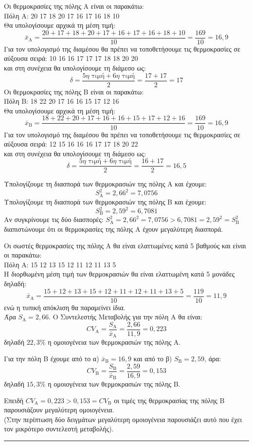 \begin{alist}
\item Οι θερμοκρασίες της πόλης Α είναι οι παρακάτω: \\
Πόλη Α: 20 17 18 20 17 16 17 16 18 10 \\
Θα υπολογίσουμε αρχικά τη μέση τιμή:
\[ \bar{x}_{\mathrm{A}} = \frac{20 + 17 + 18 + 20 + 17 + 16 + 17 + 16 + 18 + 10}{10} = \frac{169}{10} = 16,9 \]
Για τον υπολογισμό της διαμέσου θα πρέπει να τοποθετήσουμε τις θερμοκρασίες σε αύξουσα σειρά: 10 16 16 17 17 17 18 18 20 20 \\
και στη συνέχεια θα υπολογίσουμε τη διάμεσο ως:
\[ \delta = \frac{5\eta \text{ τιμή} + 6\eta \text{ τιμή}}{2} = \frac{17 + 17}{2} = 17 \]
Οι θερμοκρασίες της πόλης Β είναι οι παρακάτω: \\
Πόλη B: 18 22 20 17 16 16 15 17 12 16 \\
Θα υπολογίσουμε αρχικά τη μέση τιμή:
\[ \bar{x}_{\mathrm{B}} = \frac{18 + 22 + 20 + 17 + 16 + 16 + 15 + 17 + 12 + 16}{10} = \frac{169}{10} = 16,9 \]
Για τον υπολογισμό της διαμέσου θα πρέπει να τοποθετήσουμε τις θερμοκρασίες σε αύξουσα σειρά: 12 15 16 16 16 17 17 18 20 22 \\
και στη συνέχεια θα υπολογίσουμε τη διάμεσο ως:
\[ \delta = \frac{5\eta \text{ τιμή} + 6\eta \text{ τιμή}}{2} = \frac{16 + 17}{2} = 16,5 \]
\item Υπολογίζουμε τη διασπορά των θερμοκρασιών της πόλης Α και έχουμε:
\[ S_{\mathrm{A}}^2 = 2,66^2 = 7,0756 \]
Υπολογίζουμε τη διασπορά των θερμοκρασιών της πόλης Β και έχουμε:
\[ S_{\mathrm{B}}^2 = 2,59^2 = 6,7081 \]
Αν συγκρίνουμε τις δύο διασπορές: $S_{\mathrm{A}}^2 = 2,66^2 = 7,0756 > 6,7081 = 2,59^2 = S_{\mathrm{B}}^2$ διαπιστώνουμε ότι οι θερμοκρασίες της πόλης Α έχουν μεγαλύτερη διασπορά.
\item Οι σωστές θερμοκρασίες της πόλης Α θα είναι ελαττωμένες κατά 5 βαθμούς και είναι οι παρακάτω: \\
Πόλη Α: 15 12 13 15 12 11 12 11 13 5 \\
Η διορθωμένη μέση τιμή των θερμοκρασιών θα είναι ελαττωμένη κατά 5 μονάδες δηλαδή:
\[ \bar{x}_{\mathrm{A}} = \frac{15 + 12 + 13 + 15 + 12 + 11 + 12 + 11 + 13 + 5}{10} = \frac{119}{10} = 11,9 \]
ενώ η τυπική απόκλιση θα παραμείνει ίδια. \\
Άρα $S_{\mathrm{A}} = 2,66$. Ο Συντελεστής Μεταβολής για την πόλη Α θα είναι:
\[ CV_{\mathrm{A}} = \frac{S_{\mathrm{A}}}{\bar{x}_{\mathrm{A}}} = \frac{2,66}{11,9} = 0,223 \]
δηλαδή $22,3\%$ η ομοιογένεια των θερμοκρασιών της πόλης Α.

Για την πόλη Β έχουμε από το α) $\bar{x}_{\mathrm{B}} = 16,9$ και από το β) $S_{\mathrm{B}} = 2,59$, άρα:
\[ CV_{\mathrm{B}} = \frac{S_{\mathrm{B}}}{\bar{x}_{\mathrm{B}}} = \frac{2,59}{16,9} = 0,153 \]
δηλαδή $15,3\%$ η ομοιογένεια των θερμοκρασιών της πόλης Β.

Επειδή $CV_{\mathrm{A}} = 0,223 > 0,153 = CV_{\mathrm{B}}$ οι τιμές της θερμοκρασίας της πόλης Β παρουσιάζουν μεγαλύτερη ομοιογένεια. \\
(Στην περίπτωση δύο δειγμάτων μεγαλύτερη ομοιογένεια παρουσιάζει αυτό που έχει τον μικρότερο συντελεστή μεταβολής).
\end{alist}
\vspace{6mm}
\noindent\rule{\textwidth}{0.4pt}
\vspace{6mm}

